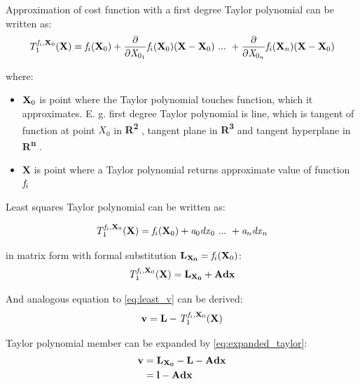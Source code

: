 \documentclass[a4paper,12pt]{article}
\newcommand{\ematr}[1]{
{\bf #1}
}
\newcommand{\evect}[1]{
{\bf #1}
}
\newcommand{\escal}[1]{
{\it #1}
}
\newcommand{\eucl}[1]{
{\bf R\textsuperscript{#1}}
}
\newcommand{\efunc}[1]{
{\it #1}
}
\begin{document}
Approximation of cost function with a first degree Taylor polynomial can be written as:
\begin{equation}
\efunc{T} ^{\efunc{f}_{i}, \evect{X}_{0}}_{1} (\evect{X}) = 
	      \efunc{f}_{i}(\evect{X}_{0}) + 
               \frac{\partial}{\partial {\escal{X}_{0_{1}}}} \efunc{f}_{i} (\evect{X}_{0}) (\evect{X} -  \evect{X}_{0}) 
\ ... \ + \frac{\partial}{\partial {\escal{X}_{0_{n}}}} \efunc{f_{i}}(\evect{X}_{n}) (\evect{X} - \evect{X}_{0}) 
\end{equation}

where:
\begin{itemize}
\item $\evect{X}_{0}$ is point where the Taylor polynomial touches function, which it approximates. E. g. first degree Taylor polynomial 
      is line, which is tangent of function at point $X_{0}$ in \eucl{2}, tangent plane in \eucl{3} and  
      tangent hyperplane in  \eucl{n}.
\item \evect{X} is point where a Taylor polynomial returns approximate value of function $\efunc{f}_{i}$
\end{itemize}

Least squares Taylor polynomial can be written as:

\begin{equation}
\efunc{T} ^{\efunc{f}_{i}, \evect{X}_{0}}_{1} (\evect{X}) =  \efunc{f}_{i}(\evect{X}_{0}) + \escal{a}_{0} \escal{dx}_{0} \ ... \ + \escal{a}_{n} \escal{dx}_{n} 
\end{equation} 

in matrix form with formal substitution $\evect{L_{X_{0}}} = \efunc{f}_{i}(\evect{X}_{0})$:
\begin{equation}
\label{eq:expanded_taylor}
\efunc{T} ^{\efunc{f}_{i}, \evect{X}_{0}}_{1} (\evect{X}) = \evect{L_{X_{0}}} + \ematr{A}\evect{dx}
\end{equation} 

And analogous equation to \eqref{eq:least_v} can be derived:
\begin{equation}
\evect{v} = \evect{L} - \efunc{T} ^{\efunc{f}_{i}, \evect{X}_{0}}_{1} (\evect{X})
\end{equation} 
 
Taylor polynomial member can be expanded by \eqref{eq:expanded_taylor}:
\begin{equation}
\begin{split}
\evect{v} &=  \evect{L_{X_{0}}} - \evect{L} - \ematr{A}\evect{dx} \\
          &= \evect{l} - \ematr{A}\evect{dx}
\end{split}
\end{equation}
\end{document}
